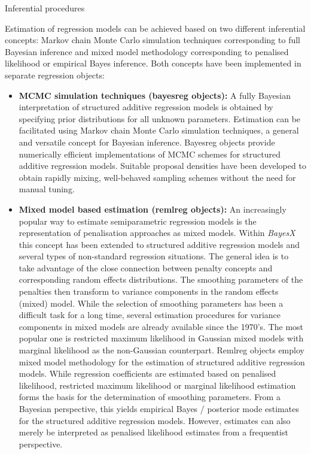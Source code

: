 \begin{stanza}{Inferential procedures}

Estimation of regression models can be achieved based on two
different inferential concepts: Markov chain Monte Carlo
simulation techniques corresponding to full Bayesian inference and
mixed model methodology corresponding to penalised likelihood or
empirical Bayes inference. Both concepts have been implemented in
separate regression objects:

\begin{itemize}
\item {\bf\sffamily MCMC simulation techniques (bayesreg objects):} A fully Bayesian interpretation of structured additive
    regression models is obtained by specifying prior distributions for all unknown parameters. Estimation can be
    facilitated using Markov chain Monte Carlo simulation techniques, a general and versatile concept for Bayesian
    inference. Bayesreg objects provide numerically efficient implementations of MCMC schemes for structured additive
    regression models. Suitable proposal densities have been developed to obtain rapidly mixing, well-behaved sampling
    schemes without the need for manual tuning.
\item{\bf\sffamily Mixed model based estimation (remlreg objects):} An increasingly popular way to estimate semiparametric
    regression models is the representation of penalisation approaches as mixed models. Within {\em BayesX }this concept
    has been extended to structured additive regression  models and several types of non-standard regression situations.
    The general idea is to take advantage of the close  connection between penalty concepts and corresponding random
    effects distributions. The smoothing parameters of the  penalties then transform to variance components in the random
    effects (mixed) model. While the selection of smoothing  parameters has been a difficult task for a long time, several
    estimation procedures for variance components in mixed models are already available since the 1970's. The most popular
    one is restricted maximum likelihood in Gaussian mixed models with marginal likelihood as the non-Gaussian counterpart.
    Remlreg objects employ mixed model methodology for the estimation of structured additive regression models. While
    regression coefficients are estimated based on penalised likelihood, restricted maximum likelihood or marginal
    likelihood estimation forms the basis for the determination of smoothing parameters. From a Bayesian perspective, this
    yields empirical Bayes / posterior mode estimates for the structured additive regression models. However, estimates can
    also merely be interpreted as penalised likelihood estimates from a frequentist perspective.
\end{itemize}
\end{stanza}


